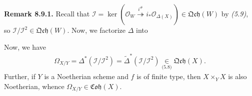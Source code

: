 \documentclass[11pt,a4paper,footinclude=true,headinclude=true]{scrbook} %
\newcommand{\acton}{\rotatebox{180}{$\,\circlearrowright$}}
\newcommand{\II}{\mathscr{I}}
\newcommand{\OO}{\mathcal{O}}
\newcommand{\<}{\langle}
\newcommand{\>}{\rangle}
\newcommand{\qcoh}{\mathfrak{Qch}}
\newcommand{\coh}{\mathfrak{Coh}}
\newcommand\Comm[2][\acton]{%
  \arrow[mysymbol]{#2}[description]{#1}}
\newenvironment{remark}[2][Remark]
    { \begin{mdframed}[backgroundcolor=gray!20] \textbf{#1 #2.} }
    {  \end{mdframed}}
\begin{document}
\begin{remark}{8.9.1}
    Recall that $\II=\ker(\OO_W\overset{i^\#}{\twoheadrightarrow}i_\ast\OO_{\Delta(X)})\in\qcoh(W)$ by \textit{(5.9)}, so $\II/\II^2\in\qcoh(W)$. Now, we factorize $\Delta$ into
    \begin{center}
    \end{center}
    Now, we have
    \begin{align*}
        \Omega_{X/Y}=\Delta^\ast(\II/\II^2)=\widetilde{\Delta}^\ast(\II/\II^2)\underset{\textit{(5.8)}}{\in}\qcoh(X).
    \end{align*}
    Further, if $Y$ is a Noetherian scheme and $f$ is of finite type, then $X\times_YX$ is also Noetherian, whence $\Omega_{X/Y}\in\coh(X)$.
\end{remark}
\end{document}
